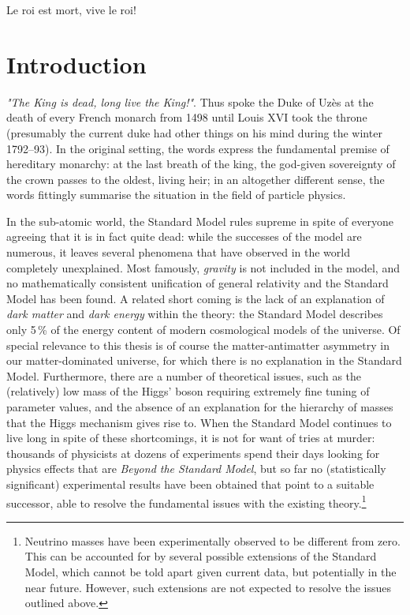 \begin{savequote}[8cm]
Le roi est mort, vive le roi!
\end{savequote}

\chapter{Introduction}
\label{ch:1-intro} 

\emph{"The King is dead, long live the King!"}. Thus spoke the Duke of Uzès at the death of every French monarch from 1498 until Louis XVI took the throne (presumably the current duke had other things on his mind during the winter 1792--93). In the original setting, the words express the fundamental premise of hereditary monarchy: at the last breath of the king, the god-given sovereignty of the crown passes to the oldest, living heir; in an altogether different sense, the words fittingly summarise the situation in the field of particle physics. 

In the sub-atomic world, the Standard Model rules supreme in spite of everyone agreeing that it is in fact quite dead: while the successes of the model are numerous, it leaves several phenomena that have observed in the world completely unexplained. Most famously, \emph{gravity} is not included in the model, and no mathematically consistent unification of general relativity and the Standard Model has been found. A related short coming is the lack of an explanation of \emph{dark matter} and \emph{dark energy} within the theory: the Standard Model describes only 5\,\% of the energy content of modern cosmological models of the universe. Of special relevance to this thesis is of course the matter-antimatter asymmetry in our matter-dominated universe, for which there is no explanation in the Standard Model. Furthermore, there are a number of theoretical issues, such as the (relatively) low mass of the Higgs' boson requiring extremely fine tuning of parameter values, and the absence of an explanation for the hierarchy of masses that the Higgs mechanism gives rise to.
When the Standard Model continues to live long in spite of these shortcomings, it is not for want of tries at murder: thousands of physicists at dozens of experiments spend their days looking for physics effects that are \emph{Beyond the Standard Model}, but so far no (statistically significant) experimental results have been obtained that point to a suitable successor, able to resolve the fundamental issues with the existing theory.\footnote{Neutrino masses have been experimentally observed to be different from zero. This can be accounted for by several possible extensions of the Standard Model, which cannot be told apart given current data, but potentially in the near future. However, such extensions are not expected to resolve the issues outlined above.} 

